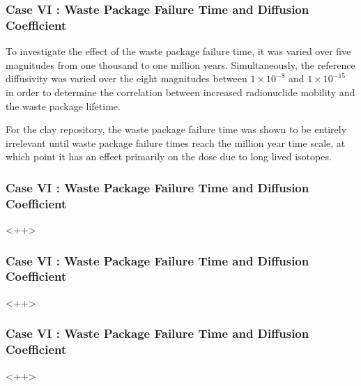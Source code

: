 

\begin{frame}[c]
  \frametitle{Case VI : Waste Package Failure Time and Diffusion Coefficient}
To investigate the effect of the waste package failure time, it was varied over 
five magnitudes from one thousand to one million years. Simultaneously, the reference 
diffusivity was varied over the eight magnitudes between $1\times10^{-8}$ and 
$1\times10^{-15}$ in order to determine the correlation between increased 
radionuclide mobility and the waste package lifetime. 


For the clay repository, the waste package failure time was shown to be entirely 
irrelevant until waste package failure times reach the million year time scale, 
at which point it has an effect primarily on the dose due to long lived 
isotopes.   
\end{frame}

\begin{frame}[c]
  \frametitle{Case VI : Waste Package Failure Time and Diffusion Coefficient}
  <++>
\end{frame}

\begin{frame}[c]
  \frametitle{Case VI : Waste Package Failure Time and Diffusion Coefficient}
  <++>
\end{frame}

\begin{frame}[c]
  \frametitle{Case VI : Waste Package Failure Time and Diffusion Coefficient}
  <++>
\end{frame}
